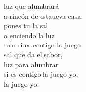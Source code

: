 \documentclass[12pt]{article}
\begin{document}
\begin{multicols*}{2}
\begin{cancion}
\begin{chorus}
	luz que alumbrará\\
	a rincón de estaueva casa.\\
	 pones tu la sal \\
	o enciendo la luz\\
	 solo si es contigo  la juego\\
	 sal que da el sabor, \\
	luz para alumbrar\\
	 si es contigo  la juego yo,\\
	 la juego yo.\\
	\end{chorus}%
	\jump\\
\end{cancion}%


\end{multicols*}
\end{document}
